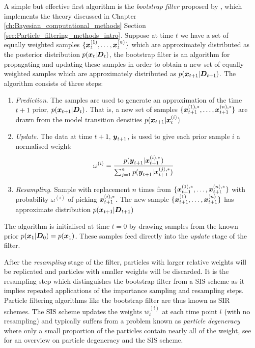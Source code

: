 A simple but effective first algorithm is the \textit{bootstrap filter} proposed by \cite{Gordon1993}, which implements
the theory discussed in Chapter \ref{ch:Bayesian_computational_methods} Section \ref{sec:Particle_filtering_methods_intro}.
Suppose at time \(t\) we have a set of equally weighted samples \(\{\boldsymbol{x}_t^{(1)}, \ldots, \boldsymbol{x}_t^{(n)}\}\) which are
approximately distributed as the posterior distribution \(p(\boldsymbol{x}_t | \boldsymbol{D}_t)\), the bootstrap filter is an algorithm
for propagating and updating these samples in order to obtain a new set of equally weighted samples which are
approximately distributed as \(p(\boldsymbol{x}_{t+1} | \boldsymbol{D}_{t+1})\). The algorithm consists of three steps:
\begin{enumerate} 
  \item \textit{Prediction}. The samples are used to generate an approximation of the time \(t+1\) prior,
  \(p(\boldsymbol{x}_{t+1} | \boldsymbol{D}_t)\). That is, a new set of samples \(\{\boldsymbol{x}_{t+1}^{(1), *}, \ldots,
  \boldsymbol{x}_{t+1}^{(n), *}\}\) are drawn from the model transition densities \(p(\boldsymbol{x}_{t+1} | \boldsymbol{x}_t^{(i)})\)
  \item \textit{Update}. The data at time \(t+1\), \(\boldsymbol{y}_{t+1}\), is used to give each prior sample \(i\) a
  normalised weight:
  \begin{align}
  \omega^{(i)} = \frac{p(\boldsymbol{y}_{t+1} | \boldsymbol{x}_{t+1}^{(i), *})}{\sum_{j = 1}^n p(\boldsymbol{y}_{t+1} | \boldsymbol{x}_{t+1}^{(j),
  *})}
  \end{align}
  \item \textit{Resampling}. Sample with replacement \(n\) times from \(\{\boldsymbol{x}_{t+1}^{(1),
  *}, \ldots, \boldsymbol{x}_{t+1}^{(n), *}\}\) with probability \(\omega^{(i)}\) of picking \(\boldsymbol{x}_{t+1}^{(i), *}\). The
  new sample \(\{\boldsymbol{x}_{t+1}^{(1)}, \ldots, \boldsymbol{x}_{t+1}^{(n)}\}\) has approximate
  distribution \(p(\boldsymbol{x}_{t+1} | \boldsymbol{D}_{t+1})\)
\end{enumerate}
The algorithm is initialised at time \(t = 0\) by drawing samples from the known prior \(p(\boldsymbol{x}_1 | \boldsymbol{D}_0) =
p(\boldsymbol{x}_1)\). These samples feed directly into the \textit{update} stage of the filter.

After the \textit{resampling} stage of the filter, particles with larger relative weights will be replicated and
particles with smaller weights will be discarded. It is the resampling step which distinguishes the bootstrap filter
from a \gls{SIS} scheme as it implies repeated applications of the importance sampling and resampling steps. Particle
filtering algorithms like the bootstrap filter are thus known as \gls{SIR} schemes. The \gls{SIS} scheme updates the
weights \(w_t^{(i)}\) at each time point \(t\) (with no resampling) and typically suffers from a problem known as
\textit{particle degeneracy} where only a small proportion of the particles contain nearly all of the weight, see
\cite{cappe2007} for an overview on particle degeneracy and the \gls{SIS} scheme.


